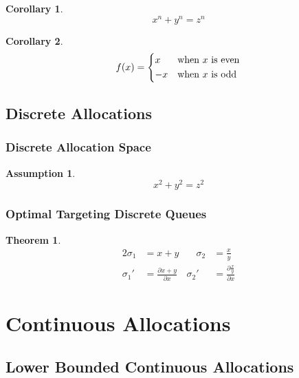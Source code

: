 \documentclass[12pt,english]{article}
\newtheorem{theorem}{Theorem}[section]
\newtheorem{corollary}{Corollary}[theorem]
\newtheorem{assumption}{Assumption}[section]
\begin{document}
\begin{corollary}
\label{corr:1a}
$$x^n + y^n = z^n$$
\blinditemize
\end{corollary}

\begin{corollary}
\label{corr:1b}
\[
 f(x) = \begin{dcases*}
        x  & when $x$ is even\\
        -x & when $x$ is odd
        \end{dcases*}
\]
\end{corollary}

\subsection{Discrete Allocations}

\subsubsection{Discrete Allocation Space}

\begin{assumption}
\label{as:1b}
\begin{equation}
 \boxed{x^2+y^2 = z^2}
\end{equation}
\end{assumption}

\subsubsection{Optimal Targeting Discrete Queues}

\begin{theorem}
\label{thm:1b}
\blinddescription
\begin{alignat}{2}
 \sigma_1 &= x + y  &\quad \sigma_2 &= \frac{x}{y} \\
 \sigma_1' &= \frac{\partial x + y}{\partial x} & \sigma_2'
    &= \frac{\partial \frac{x}{y}}{\partial x}
\end{alignat}
\end{theorem}

\blindtext

\section{Continuous Allocations}

\blindtext

\subsection{Lower Bounded Continuous Allocations}
\end{document}
